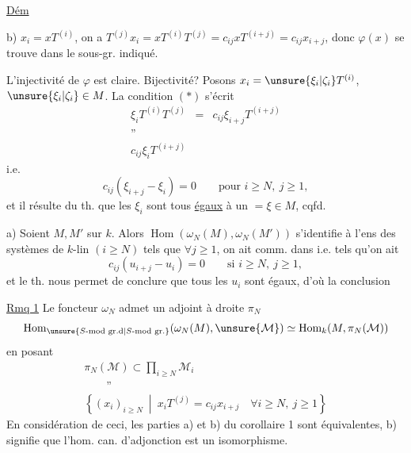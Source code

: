\uline{Dém}

b) $x_i=xT^{(i)}$, on a $T^{(j)}x_i=xT^{(i)}T^{(j)}=c_{ij}xT^{(i+j)}=c_{ij}x_{i+j}$, donc $\varphi(x)$ se trouve dans le sous-gr. indiqué.

L'injectivité de $\varphi$ est claire. Bijectivité? Posons $x_i=\unsure{\xi_i|\zeta_i}T^{(i)}$, $\unsure{\xi_i|\zeta_i}\in M$. La condition $(*)$ s'écrit
\[
\begin{array}{ccc}
\xi_iT^{(i)}T^{(j)}&=&c_{ij}\xi_{i+j}T^{(i+j)}\\
\text{''}&&\\
c_{ij}\xi_iT^{(i+j)}&&
\end{array}
\]
i.e.
\[
c_{ij}(\xi_{i+j}-\xi_i)=0\qquad\text{pour }i\geq N,\ j\geq1,
\]
et il résulte du th. que les $\xi_i$ sont tous \uline{égaux} à un $=\xi\in M$, cqfd.

a) Soient $M,M'$ sur $k$. Alors $\operatorname{Hom}(\omega_N(M),\omega_N(M'))$ s'identifie à l'ens des systèmes de $k$-lin $(i\geq N)$
tels que $\forall j\geq1$, on ait comm. dans
i.e. tels qu'on ait
\[
c_{ij}(u_{i+j}-u_i)=0\qquad\text{si }i\geq N,\ j\geq1,
\]
et le th. nous permet de conclure que tous les $u_i$ sont égaux, d'où la conclusion

\uline{Rmq 1} Le foncteur $\omega_N$ admet un adjoint à droite $\pi_N$
\[
\operatorname{Hom}_{\unsure{S\text{-mod gr.d}|S\text{-mod gr.}}}(\omega_N(M),\unsure{\mathcal M})\simeq\operatorname{Hom}_k(M,\pi_N(\mathcal M))
\]
en posant
\[
\begin{array}{l}
\pi_N(\mathcal M)\subset\displaystyle\prod_{i\geq N}\mathcal M_i\\
\qquad\text{''}\\
\displaystyle\left\{(x_i)_{i\geq N}\ \middle|\ x_iT^{(j)}=c_{ij}x_{i+j}\quad\forall i\geq N,\ j\geq1\right\}
\end{array}
\]
En considération de ceci,  les parties a) et b) du corollaire 1 sont équivalentes, b) signifie que l'hom. can. d'adjonction
est  un isomorphisme.

